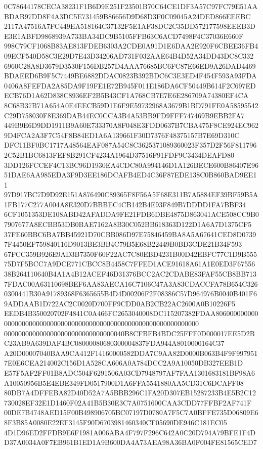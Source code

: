 \documentclass[UTF8,fontset=fandol,zihao=-4,a4paper]{ctexart}
\begin{document}
{{0C78644178CECA38231F1B6D9E251F23501B70C64CE1DF3A57C97FC79E51AABDAB97DD8F4A3DC5E731459B86656D9D68D3F0C09045A24DED866EEEBC
2117A47516A7FC449EA518164C37132F5E1AF38DC2C35DD572177598EEEB3DE3E1ABFD9868939A733BA34DC9B5105FFB63C6ACD7498F4C37036E660F
998C79CF1068B83AE813FDEB6303A2CDE0A91D1E6DAA2E920F6CBEE36FB409ECF540D58C3E29D7E43D34206AD731F032AAE64B4D52A34DD43DC8C332
6960C28A8D3679D3530F156DB257D4AAA76685BC6FC87E66ED9A26DAD4469BDAEED6B9F5C7449BE6882DDAC0823B392BDC6C3E3ED4F454F593A93FDA
0406A8FEFDA2A85DA9F19FE1E72B945F011E186DA6CF50449B614F2C697EDECB76D1A62D838C8936EF2B5B43CF1A768CB7E7E6E286709A74380EF4CA
8C68B37B71A654A0E4EECB59D1E6F9E59732968A3679B1BD791FE0A58595542C29D758030F8E369DAB44EC0CCA3B4A53BB9FD9FFF747469B9EBB2FA7
449B9E6D9DD1911B9A60E733370A8F048E3FDD0637B7CBA475F8CE924EC9629D4FCA2A3F7C54F8B84ED1A6A139661F30D7376F48375157B7E69D310C
DFC11BF0BC1717A48564EAF087A54C8C3625371089360023F357D2F56F8117962C52B1BC6813FEF8B291CF4234A1964D37516F91FDF9C3434DEAFD80
3DD126FCCEF4C13BC96D1930EA4CDC80A994146D1A126BECE600B86407E9651DAE6AA985EDA3F9D3EE186DCAFB4ED4C36F87EDE138C0B860BAD9EE11
97D917BC7D9D92E151A876490C89365F8F56A5F68E311B7A5884EF39BF59B5A1FB177C277A004A8E320D7BBBEC4CB142B4E93F849B7DDDD1FA7BBF34
6CF1051353DE108ABD42AFADDA9FE21FDB6DBE4875D863041ACE508CC9B07907677A8ECBB53DB0BAE7162A8B30C052BB618363D122D1A6A7D1375CF5
37FE60BBC6BA7BB45921D70CBB086D97E75846459BA8A5A67641CED8D07397F4450EF759840116D9013BE3BB4C79B5E68B22449B0BD3CDE21B34F593
67FCC359B926E9AD3B7350F60F22AC7C80EBD4231B00D42EBFC77C1D9B55575D7F5BCC7A9DCE771CBCC8B4458C7FFED1ACE91618A61A1E0ED3F67556
38B264110640B4A1A4B12ACEF46D31376BCC2AC2CDABE83FAF55CB8BB7137FDAC00A63110698BEF6AA83AECA16C7106C47A3A83CDACCFA78B654C326
0300441B30A91789368F6365655B4D4D00206F2F08386C57D964976B0040B401F69ADDAAB1D722AC2C0020D700FF9CDD0AB2CB22AC2600A0B10226F5
EEDB4B350020702F4841C0A466FC2653040008DC115207382FDAA8060000000000000000000000000000000000000000000000000000000000000000
0000000000000000000000000000000040B8CFBFB4BDC25FFF0D000017EE5D2BC23AB9A639DAF4BC08000080680300004837FDA944A8010000164C37
A20D00007040BAA9CA412F14160000582DDA7C9AA82D0000B063B4F9F9979517E0E6CEA214002C156D1A528CA606A0A784DCC2A9A10050DB327EEB1D
E57F5AF2FF01B8ADC504F6291506A03CD7948797AF7FAA1301683181BF98A6A10050956B5E4EBE349FD0517900D1A6FFA5541880AA5CD31C6DCAFF08
80DB7A4DFFEBA82D40D52A7A5BBB296C1FA20D307EB15287233B4E5B2C12730028EF32E1D1460F02A41B5B30E3C7A0751600CAA3CDD77FFBF2AF741F
00DE7B4748AED15F00B498906705BC07197D0780A7F5C7A0BFFE735D06809E68F3B85A0080E22EF3145F90D6703981460340CF05690DE946C181EC05
4D1D96ED2FFDB9E6F1981A006ABA4F797F296C642A0C20D794A79BFE1F4DD37A0034A0F7EB961B1ED1A9B600DA4A73AEA98A36BA0F004FE81565CED7
}}
\end{document}
